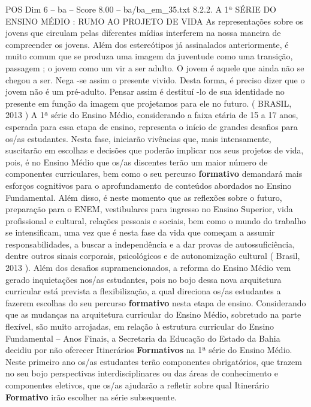 \begin{textsample}{POS Dim 6 – ba – Score 8.00 – ba/ba\_em\_35.txt}  \label{ex:f6_pos_075}
8.2.2.
A 1ª SÉRIE DO ENSINO MÉDIO : RUMO AO PROJETO DE VIDA As representações sobre os jovens que circulam pelas diferentes mídias interferem na nossa maneira de compreender os jovens.
Além dos estereótipos já assinalados anteriormente, é muito comum que se produza uma imagem da juventude como uma transição, passagem ; o jovem como um vir a ser adulto.
O jovem é aquele que ainda não se chegou a ser.
Nega -se assim o presente vivido.
Desta forma, é preciso dizer que o jovem não é um pré-adulto.
Pensar assim é destituí -lo de sua identidade no presente em função da imagem que projetamos para ele no futuro. ( BRASIL, 2013 ) A 1ª série do Ensino Médio, considerando a faixa etária de 15 a 17 anos, esperada para essa etapa de ensino, representa o início de grandes desafios para os/as estudantes.
Nesta fase, iniciarão vivências que, mais intensamente, suscitarão em escolhas e decisões que poderão implicar nos seus projetos de vida, pois, é no Ensino Médio que os/as discentes terão um maior número de componentes curriculares, bem como o seu percurso \textbf{formativo} demandará mais esforços cognitivos para o aprofundamento de conteúdos abordados no Ensino Fundamental.
Além disso, é neste momento que as reflexões sobre o futuro, preparação para o ENEM, vestibulares para ingresso no Ensino Superior, vida profissional e cultural, relações pessoais e sociais, bem como o mundo do trabalho se intensificam, uma vez que é nesta fase da vida que começam a assumir responsabilidades, a buscar a independência e a dar provas de autossuficiência, dentre outros sinais corporais, psicológicos e de autonomização cultural ( Brasil, 2013 ).
Além dos desafios supramencionados, a reforma do Ensino Médio vem gerado inquietações nos/as estudantes, pois no bojo dessa nova arquitetura curricular está prevista a flexibilização, a qual direciona os/as estudantes a fazerem escolhas do seu percurso \textbf{formativo} nesta etapa de ensino.
Considerando que as mudanças na arquitetura curricular do Ensino Médio, sobretudo na parte flexível, são muito arrojadas, em relação à estrutura curricular do Ensino Fundamental – Anos Finais, a Secretaria da Educação do Estado da Bahia decidiu por não oferecer Itinerários \textbf{Formativos} na 1ª série do Ensino Médio.
Neste primeiro ano os/as estudantes terão componentes obrigatórios, que trazem no seu bojo perspectivas interdisciplinares ou das áreas de conhecimento e componentes eletivos, que os/as ajudarão a refletir sobre qual Itinerário \textbf{Formativo} irão escolher na série subsequente.

\end{textsample}
